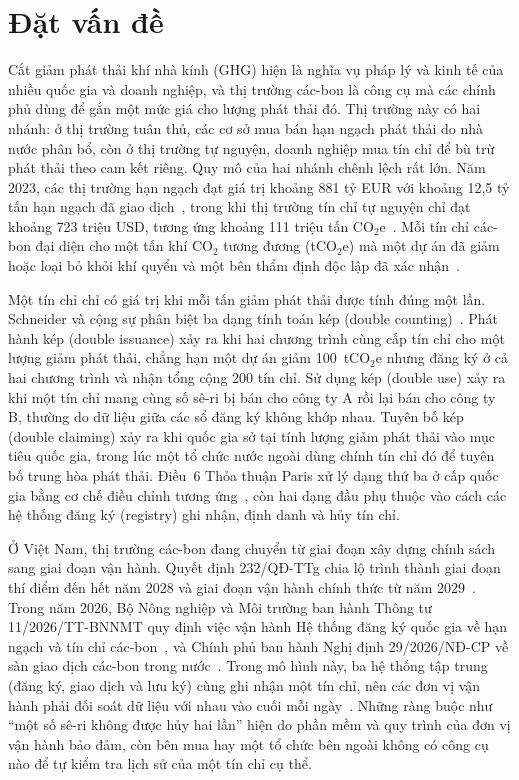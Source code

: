 \section{Đặt vấn đề}
\label{sec:datvande}
\label{sec:dongluc}

Cắt giảm phát thải khí nhà kính (GHG) hiện là nghĩa vụ pháp lý và kinh tế của nhiều quốc gia và doanh nghiệp, và thị trường các-bon là công cụ mà các chính phủ dùng để gắn một mức giá cho lượng phát thải đó. Thị trường này có hai nhánh: ở thị trường tuân thủ, các cơ sở mua bán hạn ngạch phát thải do nhà nước phân bổ, còn ở thị trường tự nguyện, doanh nghiệp mua tín chỉ để bù trừ phát thải theo cam kết riêng. Quy mô của hai nhánh chênh lệch rất lớn. Năm 2023, các thị trường hạn ngạch đạt giá trị khoảng 881 tỷ EUR với khoảng 12,5 tỷ tấn hạn ngạch đã giao dịch~\cite{lseg2024yir}, trong khi thị trường tín chỉ tự nguyện chỉ đạt khoảng 723 triệu USD, tương ứng khoảng 111 triệu tấn CO$_2$e~\cite{foresttrends2024sovcm}. Mỗi tín chỉ các-bon đại diện cho một tấn khí CO$_2$ tương đương (tCO$_2$e) mà một dự án đã giảm hoặc loại bỏ khỏi khí quyển và một bên thẩm định độc lập đã xác nhận~\cite{verra2024vcs}.

Một tín chỉ chỉ có giá trị khi mỗi tấn giảm phát thải được tính đúng một lần. Schneider và cộng sự phân biệt ba dạng tính toán kép (double counting)~\cite{schneider2019double}. Phát hành kép (double issuance) xảy ra khi hai chương trình cùng cấp tín chỉ cho một lượng giảm phát thải, chẳng hạn một dự án giảm 100~tCO$_2$e nhưng đăng ký ở cả hai chương trình và nhận tổng cộng 200 tín chỉ. Sử dụng kép (double use) xảy ra khi một tín chỉ mang cùng số sê-ri bị bán cho công ty A rồi lại bán cho công ty B, thường do dữ liệu giữa các sổ đăng ký không khớp nhau. Tuyên bố kép (double claiming) xảy ra khi quốc gia sở tại tính lượng giảm phát thải vào mục tiêu quốc gia, trong lúc một tổ chức nước ngoài dùng chính tín chỉ đó để tuyên bố trung hòa phát thải. Điều~6 Thỏa thuận Paris xử lý dạng thứ ba ở cấp quốc gia bằng cơ chế điều chỉnh tương ứng~\cite{unfccc2022cma3}, còn hai dạng đầu phụ thuộc vào cách các hệ thống đăng ký (registry) ghi nhận, định danh và hủy tín chỉ.

Ở Việt Nam, thị trường các-bon đang chuyển từ giai đoạn xây dựng chính sách sang giai đoạn vận hành. Quyết định 232/QĐ-TTg chia lộ trình thành giai đoạn thí điểm đến hết năm 2028 và giai đoạn vận hành chính thức từ năm 2029~\cite{vietnam2025qd232}. Trong năm 2026, Bộ Nông nghiệp và Môi trường ban hành Thông tư 11/2026/TT-BNNMT quy định việc vận hành Hệ thống đăng ký quốc gia về hạn ngạch và tín chỉ các-bon~\cite{vietnam2026thongtu11}, và Chính phủ ban hành Nghị định 29/2026/NĐ-CP về sàn giao dịch các-bon trong nước~\cite{vietnam2026nghidinh29}. Trong mô hình này, ba hệ thống tập trung (đăng ký, giao dịch và lưu ký) cùng ghi nhận một tín chỉ, nên các đơn vị vận hành phải đối soát dữ liệu với nhau vào cuối mỗi ngày~\cite{vietnam2026thongtu11}. Những ràng buộc như ``một số sê-ri không được hủy hai lần'' hiện do phần mềm và quy trình của đơn vị vận hành bảo đảm, còn bên mua hay một tổ chức bên ngoài không có công cụ nào để tự kiểm tra lịch sử của một tín chỉ cụ thể.

